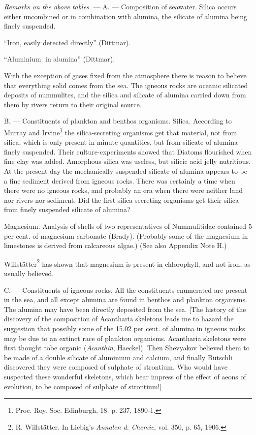 \documentclass[a4paper, 12pt, oneside]{article}
\begin{document}
\emph{Remarks on the above tables}. --- A. --- Composition of seawater. Silica occurs either uncombined or in combination with alumina, the silicate of alumina being finely suspended.

``Iron, easily detected directly'' (Dittmar).

``Aluminium: in alumina'' (Dittmar).

With the exception of gases fixed from the atmosphere there is reason to believe that everything solid comes from the sea. The igneous rocks are oceanic silicated deposits of nummulites, and the silica and silicate of alumina carried down from them by rivers return to their original source.

B. --- Constituents of plankton and benthos organisms. Silica. According to Murray and Irvine\footnote{Proc. Roy. Soc. Edinburgh, 18. p. 237, 1890-1.} the silica-secreting organisms get that material, not from silica, which is only present in minute quantities, but from silicate of alumina finely suspended. Their culture-experiments showed that Diatoms flourished when fine clay was added. Amorphous silica was useless, but silicic acid jelly nutritious. At the present day the mechanically suspended silicate of alumina appears to be a fine sediment derived from igneous rocks. There was certainly a time when there were no igneous rocks, and probably an era when there were neither land nor rivers nor sediment. Did the first silica-secreting organisms get their silica from finely suspended silicate of alumina?

Magnesium. Analysis of shells of two representatives of Nummulitidae contained 5 per cent. of magnesium carbonate (Brady). (Probably some of the magnesium in limestones is derived from calcareous algae.) (See also Appendix Note H.)

Willstätter\footnote{R. Willstätter. In Liebig's \emph{Annalen d. Chemie}, vol. 350, p. 65, 1906.} has shown that magnesium is present in chlorophyll, and not iron, as usually believed.

C. --- Constituents of igneous rocks. All the constituents enumerated are present in the sea, and all except alumina are found in benthos and plankton organisms. The alumina may have been directly deposited from the sea. [The history of the discovery of the composition of Acantharia skeletons leads me to hazard the suggestion that possibly some of the 15.02 per cent. of alumina in igneous rocks may be due to an extinct race of plankton organisms. Acantharia skeletons were first thought tobe organic (\emph{Acanthin}, Haeckel). Then Shevyakov believed them to be made of a double silicate of aluminium and calcium, and finally Bütschli discovered they were composed of sulphate of strontium. Who would have suspected these wonderful skeletons, which bear impress of the effect of aeons of evolution, to be composed of sulphate of strontium!]
\end{document}
